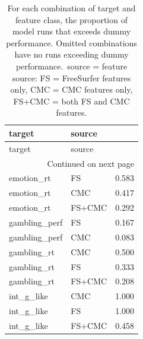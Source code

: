 \documentclass{article}
\begin{document}


\begin{longtable}{llr}
	\caption{For each combination of target and feature class, the proportion of model runs that exceeds dummy performance. Omitted combinations have no runs exceeding dummy performance.\ source = feature source: FS = FreeSurfer features only, CMC = CMC features only, FS+CMC = both FS and CMC features.} \label{tab:cmc-p-target-predictive} \\
	\toprule
	target & source & {} \\
	\midrule
	\endfirsthead
	\toprule
	target & source & {} \\
	\midrule
	\endhead
	\midrule
	\multicolumn{3}{r}{Continued on next page} \\
	\midrule
	\endfoot
	\bottomrule
	\endlastfoot
	emotion\_rt & FS & 0.583 \\
	emotion\_rt & CMC & 0.417 \\
	\vspace{0.2cm}
	emotion\_rt & FS+CMC & 0.292 \\
	gambling\_perf & FS & 0.167 \\
	\vspace{0.2cm}
	gambling\_perf & CMC & 0.083 \\
	gambling\_rt & CMC & 0.500 \\
	gambling\_rt & FS & 0.333 \\
	\vspace{0.2cm}
	gambling\_rt & FS+CMC & 0.208 \\
	int\_g\_like & CMC & 1.000 \\
	int\_g\_like & FS & 1.000 \\
	\vspace{0.2cm}
	int\_g\_like & FS+CMC & 0.458 \\

\end{longtable}
\end{document}
